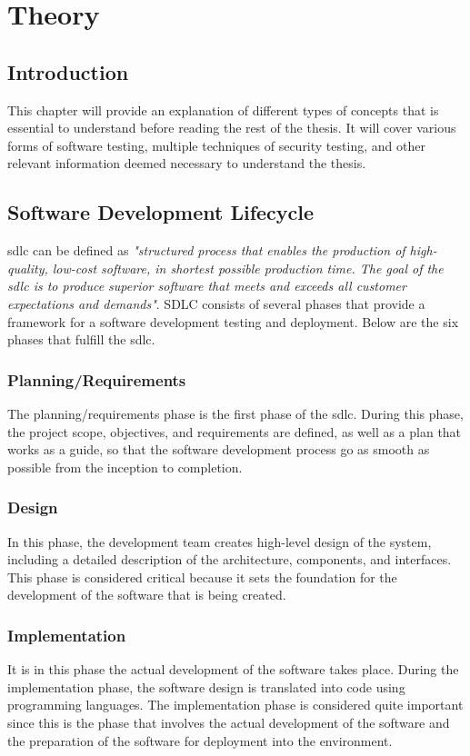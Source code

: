 \chapter{Theory}
\label{chap:Theory}

\section{Introduction}
This chapter will provide an explanation of different types of concepts that is essential to understand before reading the rest of the thesis. It will cover various forms of software testing, multiple techniques of security testing, and other relevant information deemed necessary to understand the thesis.


\section{Software Development Lifecycle}
\acrlong{sdlc} can be defined as \textit{"structured process that enables the production of high-quality, low-cost software, in shortest possible production time. The goal of the \acrshort{sdlc} is to produce superior software that meets and exceeds all customer expectations and demands"}\cite{sdlc1}.  SDLC consists of several phases that provide a framework for a software development testing and deployment. Below are the six phases that fulfill the \acrshort{sdlc}. 

  \subsection{Planning/Requirements} 
 The planning/requirements phase is the first phase of the \acrshort{sdlc}. During this phase, the project scope, objectives, and requirements are defined, as well as a plan that works as a guide, so that the software development process go as smooth as possible from the inception to completion. \cite{PlanningSDLC}
 
 \subsection{Design}
 In this phase, the development team creates high-level design of the system, including a detailed description of the architecture, components, and interfaces. This phase is considered critical because it sets the foundation for the development of the software that is being created. \cite{DesignSDLC} 
 
 \subsection{Implementation}
 It is in this phase the actual development of the software takes place. During the implementation phase, the software design is translated into code using programming languages. The implementation phase is considered quite important since this is the phase that involves the actual development of the software and the preparation of the software for deployment into the environment. \cite{ImplementationSDLC}
 
